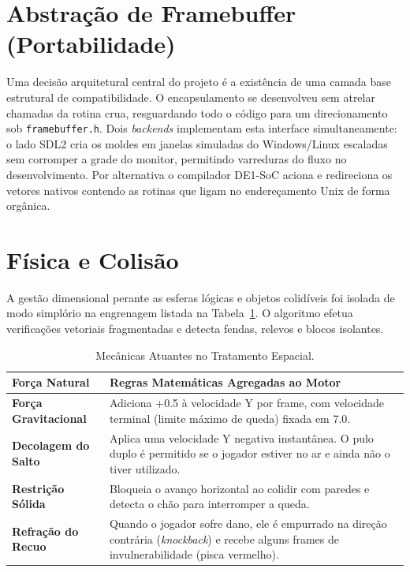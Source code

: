 \documentclass[10pt,twocolumn,letterpaper]{article}
\begin{document}
\section{Abstração de Framebuffer (Portabilidade)}
Uma decisão arquitetural central do projeto é a existência de uma camada base estrutural de compatibilidade. O encapsulamento se desenvolveu sem atrelar chamadas da rotina crua, resguardando todo o código para um direcionamento sob \texttt{framebuffer.h}. Dois \textit{backends} implementam esta interface simultaneamente: o lado SDL2 cria os moldes em janelas simuladas do Windows/Linux escaladas sem corromper a grade do monitor, permitindo varreduras do fluxo no desenvolvimento. Por alternativa o compilador DE1-SoC aciona e redireciona os vetores nativos contendo as rotinas que ligam no endereçamento Unix de forma orgânica. 

\section{Física e Colisão}
A gestão dimensional perante as esferas lógicas e objetos colidíveis foi isolada de modo simplório na engrenagem listada na Tabela~\ref{tab:fisica}. O algoritmo efetua verificações vetoriais fragmentadas e detecta fendas, relevos e blocos isolantes.

\begin{table}[H]
\centering
\caption{Mecânicas Atuantes no Tratamento Espacial.}
\label{tab:fisica}
\scriptsize
\begin{tabularx}{\columnwidth}{@{}lX@{}}
\toprule
\textbf{Força Natural} & \textbf{Regras Matemáticas Agregadas ao Motor} \\ \midrule
\textbf{Força Gravitacional} & Adiciona +0.5 à velocidade Y por frame, com velocidade terminal (limite máximo de queda) fixada em 7.0. \\
\textbf{Decolagem do Salto} & Aplica uma velocidade Y negativa instantânea. O pulo duplo é permitido se o jogador estiver no ar e ainda não o tiver utilizado. \\
\textbf{Restrição Sólida} & Bloqueia o avanço horizontal ao colidir com paredes e detecta o chão para interromper a queda. \\
\textbf{Refração do Recuo} & Quando o jogador sofre dano, ele é empurrado na direção contrária (\textit{knockback}) e recebe alguns frames de invulnerabilidade (pisca vermelho). \\ \bottomrule
\end{tabularx}
\end{table}
\end{document}
